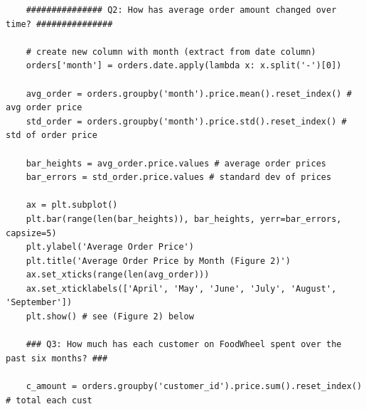 \documentclass[11pt, a4paper]{article}
\begin{document}
\begin{spacing}{1.1}
\begin{lstlisting}
	############### Q2: How has average order amount changed over time? ###############
	
	# create new column with month (extract from date column)
	orders['month'] = orders.date.apply(lambda x: x.split('-')[0])
	
	avg_order = orders.groupby('month').price.mean().reset_index() # avg order price
	std_order = orders.groupby('month').price.std().reset_index() # std of order price
	
	bar_heights = avg_order.price.values # average order prices
	bar_errors = std_order.price.values # standard dev of prices
	
	ax = plt.subplot()
	plt.bar(range(len(bar_heights)), bar_heights, yerr=bar_errors, capsize=5)
	plt.ylabel('Average Order Price')
	plt.title('Average Order Price by Month (Figure 2)')
	ax.set_xticks(range(len(avg_order)))
	ax.set_xticklabels(['April', 'May', 'June', 'July', 'August', 'September'])
	plt.show() # see (Figure 2) below
	
	### Q3: How much has each customer on FoodWheel spent over the past six months? ###
	
	c_amount = orders.groupby('customer_id').price.sum().reset_index() # total each cust
	

\end{lstlisting}
\end{spacing}
\end{document}
